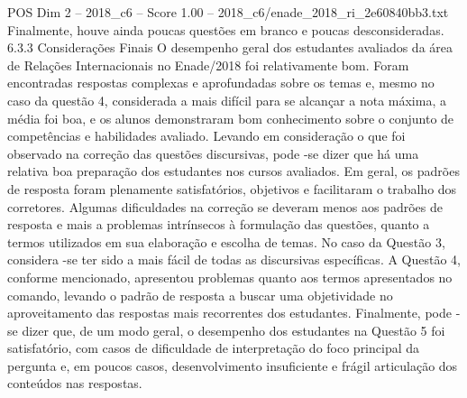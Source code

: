 \begin{textsample}{POS Dim 2 – 2018\_c6 – Score 1.00 – 2018\_c6/enade\_2018\_ri\_2e60840bb3.txt}
Finalmente, houve ainda poucas questões em branco e poucas desconsideradas. 6.3.3 Considerações Finais O desempenho geral dos estudantes avaliados da área de Relações Internacionais no Enade/2018 foi relativamente bom.
Foram encontradas respostas complexas e aprofundadas sobre os temas e, mesmo no caso da questão 4, considerada a mais difícil para se alcançar a nota máxima, a média foi boa, e os alunos demonstraram bom conhecimento sobre o conjunto de competências e habilidades avaliado.
Levando em consideração o que foi observado na correção das questões discursivas, pode -se dizer que há uma relativa boa preparação dos estudantes nos cursos avaliados.
Em geral, os padrões de resposta foram plenamente satisfatórios, objetivos e facilitaram o trabalho dos corretores.
Algumas dificuldades na correção se deveram menos aos padrões de resposta e mais a problemas intrínsecos à formulação das questões, quanto a termos utilizados em sua elaboração e escolha de temas.
No caso da Questão 3, considera -se ter sido a mais fácil de todas as discursivas específicas.
A Questão 4, conforme mencionado, apresentou problemas quanto aos termos apresentados no comando, levando o padrão de resposta a buscar uma objetividade no aproveitamento das respostas mais recorrentes dos estudantes.
Finalmente, pode -se dizer que, de um modo geral, o desempenho dos estudantes na Questão 5 foi satisfatório, com casos de dificuldade de interpretação do foco principal da pergunta e, em poucos casos, desenvolvimento insuficiente e frágil articulação dos conteúdos nas respostas.

\end{textsample}
